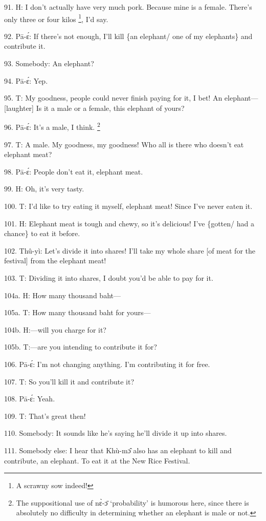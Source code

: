 91. H: I don't actually have very much pork.  Because mine is a female.  There's
only three or four kilos \footnote{A scrawny sow indeed!}, I'd say.

92. Pā-ɛ́: If there's not enough, I'll kill \{an elephant/ one of my elephants\}
and contribute it.

93. Somebody: An elephant?

94. Pā-ɛ́: Yep.

95. T: My goodness, people could never finish paying for it, I bet!  An elephant---[laughter]
Is it a male or a female, this elephant of yours?

96. Pā-ɛ́: It's a male, I think. \footnote{The suppositional use of nɛ̀-ɔ̄ `probability' is humorous here, since there is absolutely no difficulty in determining whether an elephant is male or not.}

97. T: A male.  My goodness, my goodness!  Who all is there who doesn't eat elephant
meat?

98. Pā-ɛ́: People don't eat it, elephant meat.

99. H: Oh, it's very tasty.

100. T: I'd like to try eating it myself, elephant meat!  Since I've never eaten
it.

101. H: Elephant meat is tough and chewy, so it's delicious!  I've \{gotten/ had
a chance\} to eat it before.

102. Thû-yì: Let's divide it into shares!  I'll take my whole share [of meat
for the festival] from the elephant meat!

103. T: Dividing it into shares, I doubt you'd be able to pay for it.

104a. H: How many thousand baht---

105a. T: How many thousand baht for yours---

104b. H:---will you charge for it?

105b. T:---are you intending to contribute it for?

106. Pā-ɛ́: I'm not changing anything.  I'm contributing it for free.

107. T: So you'll kill it and contribute it?

108. Pā-ɛ́: Yeah.

109. T: That's great then!

110. Somebody: It sounds like he's saying he'll divide it up into shares.

111. Somebody else: I hear that Khù-mɔ̂ also has an elephant to kill and contribute,
an elephant.  To eat it at the New Rice Festival.

